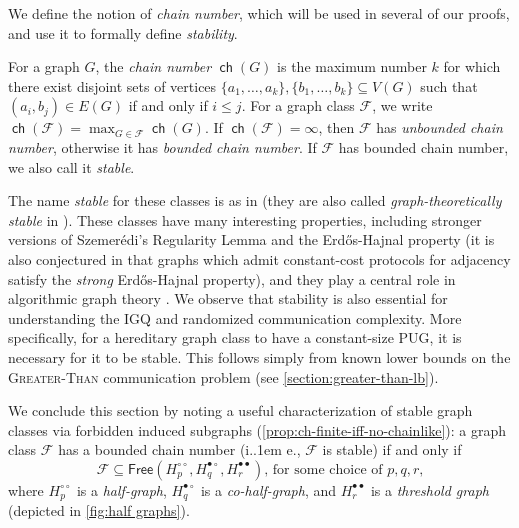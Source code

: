 \documentclass{theoretics}
\makeatletter
\newcommand{\cF}{\ensuremath{\mathcal{F}}}
\newcommand*\ie{i.\kern.1em e.\@\xspace} %
\newcommand{\RL}{\mathsf{SK}}
\DeclareMathOperator\ch{\mathsf{ch}}
\newcommand{\free}{\mathsf{Free}}
\newcommand\IfRestateTF{%
  \ifx\label\thmt@gobble@label %
    \expandafter\@firstoftwo
  \else
    \expandafter\@secondoftwo
  \fi
}
\newcommand{\RestateRemark}{\IfRestateTF{{\normalfont\bfseries (Restated) }}{}}
\makeatother
\begin{document}
We define the notion of \emph{chain number}, which will be used in several of our proofs, and use it
to formally define \emph{stability}.

\begin{definition}
\label{def:chain number}
For a graph $G$, the \emph{chain number} $\ch(G)$ is the maximum number $k$ for which there exist
disjoint sets of vertices $\{a_1, \dotsc, a_k\}, \{b_1, \dotsc, b_k\} \subseteq V(G)$ such that
$(a_i,b_j) \in E(G)$ if and only if $i \leq j$. For a graph class $\cF$, we write $\ch(\cF) =
\max_{G \in \cF} \ch(G)$.  If $\ch(\cF) = \infty$, then $\cF$ has \emph{unbounded chain
number}, otherwise it has \emph{bounded chain number}. If $\cF$ has bounded chain number, we also
call it \emph{stable}.
\end{definition}

The name \emph{stable} for these classes is as in \cite{CS18,NMP+21} (they are also called
\emph{graph-theoretically stable} in \cite{GPT21}). These classes have many interesting properties,
including stronger versions of Szemer{\'e}di's Regularity Lemma \cite{MS14} and the Erd{\H
o}s-Hajnal property \cite{CS18} (it is also conjectured in \cite{HHH23dimfree} that graphs which
admit constant-cost protocols for adjacency satisfy the \emph{strong} Erd{\H o}s-Hajnal property),
and they play a central role in algorithmic graph theory \cite{GPT21}.  We observe that stability is
also essential for understanding the IGQ and randomized communication complexity. More specifically,
for a hereditary graph class to have a constant-size PUG, it is necessary for it to be stable. This
follows simply from known lower bounds on the \textsc{Greater-Than} communication problem (see
\cref{section:greater-than-lb}).





We conclude this section by noting a useful characterization of stable graph classes via forbidden induced subgraphs 
(\cref{prop:ch-finite-iff-no-chainlike}): a graph class $\cF$ has a bounded chain number
(\ie, $\cF$ is stable) if and only if 
$$
	\cF \subseteq \free(H^{\circ\circ}_p, H^{\bullet\circ}_q, H^{\bullet\bullet}_r) \text{, for some choice of $p,q,r$,}
$$
where $H^{\circ\circ}_p$ is a \emph{half-graph}, $H^{\bullet\circ}_q$ is a \emph{co-half-graph}, and $H^{\bullet\bullet}_r$ is a \emph{threshold graph} (depicted in \cref{fig:half graphs}).
\end{document}
